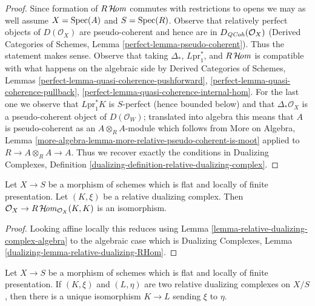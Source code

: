 \begin{proof}
Since formation of $R\mathop{\mathcal{H}\!\mathit{om}}\nolimits$ commutes with restrictions to
opens we may as well assume $X = \mathop{\mathrm{Spec}}(A)$ and $S = \mathop{\mathrm{Spec}}(R)$.
Observe that relatively perfect objects of $D(\mathcal{O}_X)$
are pseudo-coherent and hence are in $D_{\mathit{QCoh}}(\mathcal{O}_X)$
(Derived Categories of Schemes, Lemma \ref{perfect-lemma-pseudo-coherent}).
Thus the statement makes sense.
Observe that taking $\Delta_*$, $L\text{pr}_1^*$, and
$R\mathop{\mathcal{H}\!\mathit{om}}\nolimits$ is compatible with what happens on the algebraic
side by
Derived Categories of Schemes,
Lemmas \ref{perfect-lemma-quasi-coherence-pushforward},
\ref{perfect-lemma-quasi-coherence-pullback},
\ref{perfect-lemma-quasi-coherence-internal-hom}.
For the last one we observe that $L\text{pr}_1^*K$
is $S$-perfect (hence bounded below) and that $\Delta_*\mathcal{O}_X$
is a pseudo-coherent object of $D(\mathcal{O}_W)$;
translated into algebra this means that $A$ is pseudo-coherent
as an $A \otimes_R A$-module which follows from
More on Algebra, Lemma
\ref{more-algebra-lemma-more-relative-pseudo-coherent-is-moot}
applied to $R \to A \otimes_R A \to A$.
Thus we recover exactly the conditions in
Dualizing Complexes, Definition
\ref{dualizing-definition-relative-dualizing-complex}.
\end{proof}

\begin{lemma}
\label{lemma-relative-dualizing-RHom}
Let $X \to S$ be a morphism of schemes which is flat and
locally of finite presentation. Let $(K, \xi)$ be a relative
dualizing complex. Then
$\mathcal{O}_X \to R\mathop{\mathcal{H}\!\mathit{om}}\nolimits_{\mathcal{O}_X}(K, K)$
is an isomorphism.
\end{lemma}

\begin{proof}
Looking affine locally this reduces using
Lemma \ref{lemma-relative-dualizing-complex-algebra}
to the algebraic case which is
Dualizing Complexes, Lemma \ref{dualizing-lemma-relative-dualizing-RHom}.
\end{proof}

\begin{lemma}
\label{lemma-uniqueness-relative-dualizing}
Let $X \to S$ be a morphism of schemes which is flat and
locally of finite presentation. If $(K, \xi)$ and $(L, \eta)$
are two relative dualizing complexes on $X/S$, then there is a unique
isomorphism $K \to L$ sending $\xi$ to $\eta$.
\end{lemma}

